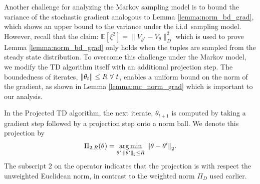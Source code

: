 \documentclass{colt2018} %
\DeclareMathOperator*{\argmin}{arg\,min}
\newcommand{\E}{\mathbb{E}}
\begin{document}
Another challenge for analyzing the Markov sampling model is to bound the variance of the stochastic gradient analogous to Lemma \ref{lemma:norm_bd_grad}, which shows an upper bound to the variance under the i.i.d\, sampling model. However, recall that the claim: $\E[\xi^2] = \| V_{\theta^*} - V_{\theta}\|_D^2$ which is used to prove Lemma \ref{lemma:norm_bd_grad} only holds when the tuples are sampled from the steady state distribution. To overcome this challenge under the Markov model, we modify the TD algorithm itself with an additional projection step.  The boundedness of iterates, $\norm{\theta_t} \leq R \,\, \forall \,\, t$, enables a uniform bound on the norm of the gradient, as shown in Lemma \ref{lemma:mc_norm_grad} which is important to our analysis. 

In the Projected TD algorithm, the next iterate, $\theta_{t+1}$ is computed by taking a gradient step followed by a projection step onto a norm ball. We denote this projection by
\begin{eqnarray*}
\Pi_{2,R}(\theta) = \argmin_{\theta': \norm{\theta'}_2 \leq R} \, \norm{\theta - \theta'}_2.
\end{eqnarray*}
The subscript $2$ on the operator indicates that the projection is with respect the unweighted Euclidean norm, in contrast to the weighted norm $\Pi_{D}$ used earlier.

\end{document}
